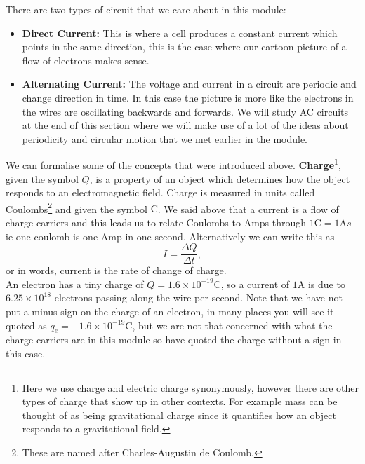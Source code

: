 There are two types of circuit that we care about in this module:
\begin{itemize}
\setlength{\itemsep}{-5pt}
    \item \textbf{Direct Current:} This is where a cell produces a constant current which points in the same direction, this is the case where our cartoon picture of a flow of electrons makes sense.
    \item \textbf{Alternating Current:} The voltage and current in a circuit are periodic and change direction in time. In this case the picture is more like the electrons in the wires are oscillating backwards and forwards. We will study AC circuits at the end of this section where we will make use of a lot of the ideas about periodicity and circular motion that we met earlier in the module.
\end{itemize}  

We can formalise some of the concepts that were introduced above. \textbf{Charge}\footnote{Here we use charge and electric charge synonymously, however there are other types of charge that show up in other contexts. For example mass can be thought of as being gravitational charge since it quantifies how an object responds to a gravitational field.}, given the symbol $Q$, is a property of an object which determines how the object responds to an electromagnetic field. Charge is measured in units called Coulombs\footnote{These are named after Charles-Augustin de Coulomb.} and given the symbol $\text{C}$. We said above that a current is a flow of charge carriers and this leads us to relate Coulombs to Amps through $1\text{C}=1\text{A}s$ ie one coulomb is one Amp in one second. Alternatively we can write this as
\begin{equation}
I=\frac{\Delta Q}{\Delta t},
\label{eq: current definition}
\end{equation}
or in words, current is the rate of change of charge.\\

An electron has a tiny charge of $Q=1.6\times10^{-19}\text{C}$, so a current of $1\text{A}$ is due to $6.25\times 10^{18}$ electrons passing along the wire per second. Note that we have not put a minus sign on the charge of an electron, in many places you will see it quoted as $q_{e}=-1.6\times10^{-19}\text{C}$, but we are not that concerned with what the charge carriers are in this module so have quoted the charge without a sign in this case.\\

